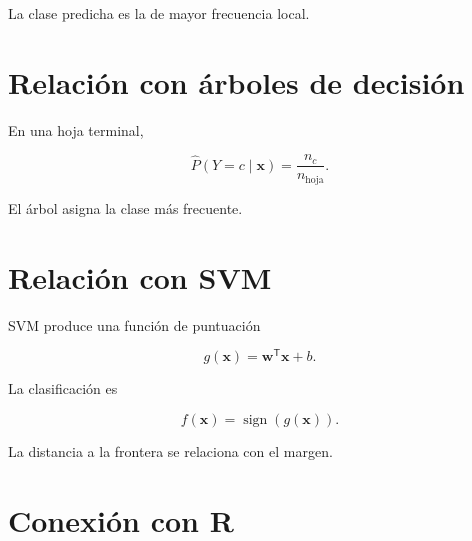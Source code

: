 \documentclass[
  spanish,
  10.5pt,
  letterpaper,
  DIV=11,
  numbers=noendperiod,
  oneside,
  open=any]{scrreprt}
\theoremstyle{definition}
\theoremstyle{definition}
\theoremstyle{plain}
\theoremstyle{remark}
\begin{document}
La clase predicha es la de mayor frecuencia local.

\section*{Relación con árboles de
decisión}\label{relaciuxf3n-con-uxe1rboles-de-decisiuxf3n-1}


En una hoja terminal,

\[
\widehat{P}(Y=c\mid\mathbf{x})
=
\frac{n_c}{n_{\text{hoja}}}.
\]

El árbol asigna la clase más frecuente.

\section*{Relación con SVM}\label{relaciuxf3n-con-svm}


SVM produce una función de puntuación

\[
g(\mathbf{x})
=
\mathbf{w}^{\mathsf T}\mathbf{x}+b.
\]

La clasificación es

\[
f(\mathbf{x})
=
\operatorname{sign}
(
g(\mathbf{x})
).
\]

La distancia a la frontera se relaciona con el margen.

\section*{Conexión con R}\label{conexiuxf3n-con-r-5}

\end{document}
